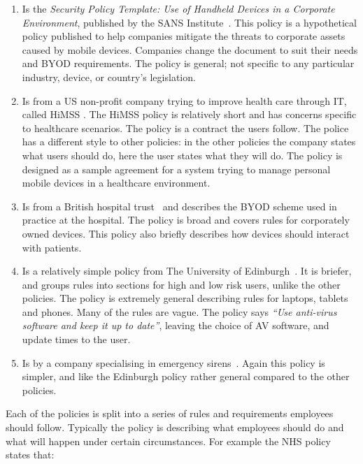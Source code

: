 \documentclass[thesis.tex]{subfiles}
\begin{document}
\begin{enumerate}
\item Is the \emph{Security Policy Template: Use of Handheld Devices
    in a Corporate Environment}, published by the SANS
  Institute~\cite{nicholas_r._c._guerin_security_2008}. This policy is a
  hypothetical policy published to help companies mitigate the threats
  to corporate assets caused by mobile devices. Companies change the
  document to suit their needs and BYOD requirements. The policy is
  general; not specific to any particular industry, device, or country's
  legislation.
\item Is from a US non-profit company trying to improve health care through IT, called \ac{HiMSS} \cite{healthcare_information_and_management_systems_society_mobile_2012}. The
  \ac{HiMSS} policy is relatively short and has concerns specific to
  healthcare scenarios. The policy is a contract the users follow. The
  police has a different style to other policies: in the other policies
  the company states what users should do, here the user states what
  they will do.  The policy is designed as a sample agreement for a
  system trying to manage personal mobile devices in a healthcare
  environment.
\item Is from a British hospital trust~\cite{kennington_mobiles_2014}
  and describes the BYOD scheme used in practice at the hospital.  The
  policy is broad and covers rules for corporately owned devices.  This
  policy also briefly describes how devices should interact with
  patients.
\item Is a relatively simple policy from The University of
  Edinburgh~\cite{williamson_bring_2015}. It is briefer, and groups
  rules into sections for high and low risk users, unlike the other
  policies.  The policy is extremely general describing rules for
  laptops, tablets and phones.  Many of the rules are vague.
  The policy says \emph{``Use anti-virus software and keep it up
    to date''}, leaving the choice of AV software, and
  update times to the user.
\item Is by a company specialising in emergency
  sirens~\cite{code3pse.org_sample_nodate}. Again this policy is simpler,
  and like the Edinburgh policy rather general compared to the other policies.
\end{enumerate}

Each of the policies is split into a series of rules and requirements employees
should follow. Typically the policy is describing what employees should
do and what will happen under certain circumstances. For example the NHS policy
states that:
\end{document}

